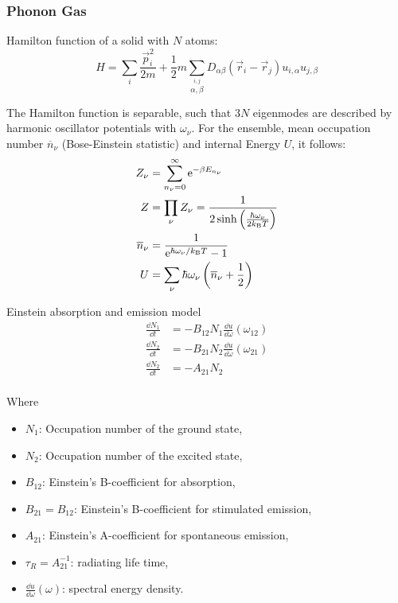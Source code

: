 		\subsubsection{Phonon Gas}
			\label{Sec:PhononGas}
			\noindent
			Hamilton function of a solid with $N$ atoms:
			\begin{equation}
				H=\sum_i \frac{\vec{p}_i^2}{2m} + \frac{1}{2}m\sum_{\stackrel{i,j}{\alpha,\beta}} D_{\alpha\beta}(\vec{r}_i - \vec{r}_j)u_{i,\alpha}u_{j,\beta}
			\end{equation}

			\noindent
			The Hamilton function is separable, such that $3N$ eigenmodes are described by harmonic oscillator potentials with $\omega_\nu$. For the ensemble, mean occupation number $\overline{n}_\nu$ (Bose-Einstein statistic) and internal Energy $U$, it follows:
			\begin{equation}
				\begin{aligned}
					Z_\nu &= \sum_{n_\nu=0}^\infty \mathrm{e}^{-\beta E_{n_\nu}} \\
					Z &= \prod_\nu Z_\nu = \frac{1}{2\sinh{\left( \frac{\hbar\omega_\nu}{2 k_{\text{B}}T} \right)}} \\
					\overline{n}_\nu &= \frac{1}{\mathrm{e}^{\hbar\omega_\nu/k_{\text{B}} T} - 1} \\
					U &= \sum_\nu \hbar\omega_\nu \left(\overline{n}_\nu + \frac{1}{2}\right)
				\end{aligned}
			\end{equation}


			\noindent
			Einstein absorption and emission model
			\begin{equation}
				\begin{aligned}
					\frac{\dd N_1}{\dd t} &= -B_{12}N_1 \frac{\dd u}{\dd \omega}(\omega_{12}) \\
					\frac{\dd N_2}{\dd t} &= -B_{21}N_2 \frac{\dd u}{\dd \omega}(\omega_{21}) \\
					\frac{\dd N_2}{\dd t} &= -A_{21}N_2\\
				\end{aligned}
			\end{equation}

			\noindent
			Where
			\begin{itemize}
				\setlength\itemsep{0pt}
				\item[] $N_1$: Occupation number of the ground state,
				\item[] $N_2$: Occupation number of the excited state,
				\item[] $B_{12}$: Einstein's B-coefficient for absorption,
				\item[] $B_{21} = B_{12}$: Einstein's B-coefficient for stimulated emission,
				\item[] $A_{21}$: Einstein's A-coefficient for spontaneous emission,
				\item[] $\tau_{R}=A_{21}^{-1}$: radiating life time,
				\item[] $\frac{\dd u}{\dd \omega}(\omega)$: spectral energy density.
			\end{itemize}

